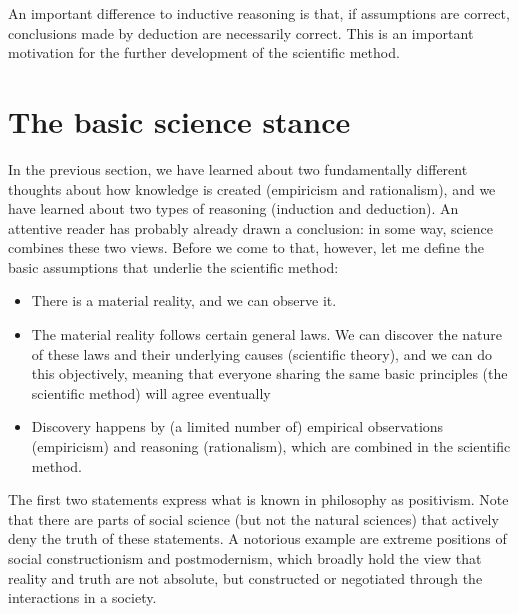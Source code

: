 \documentclass{tufte-book}
\begin{document}
An important difference to inductive reasoning is that, if assumptions are correct, conclusions made by deduction are necessarily correct. This is an important motivation for the further development of the scientific method.


\section{The basic science stance}

In the previous section, we have learned about two fundamentally different thoughts about how knowledge is created (empiricism and rationalism), and we have learned about two types of reasoning (induction and deduction). An attentive reader has probably already drawn a conclusion: in some way, science combines these two views. Before we come to that, however, let me define the basic assumptions that underlie the scientific method:

\begin{itemize}
\item There is a material reality, and we can observe it.
\item The material reality follows certain general laws. We can discover the nature of these laws and their underlying causes (scientific theory), and we can do this objectively, meaning that everyone sharing the same basic principles (the scientific method) will agree eventually
\item Discovery happens by (a limited number of) empirical observations (empiricism) and reasoning (rationalism), which are combined in the scientific method. 
\end{itemize}

The first two statements express what is known in philosophy as positivism. Note that there are parts of social science (but not the natural sciences) that actively deny the truth of these statements. A notorious example are extreme positions of social constructionism and postmodernism, which broadly hold the view that reality and truth are not absolute, but constructed or negotiated through the interactions in a society.
\end{document}

